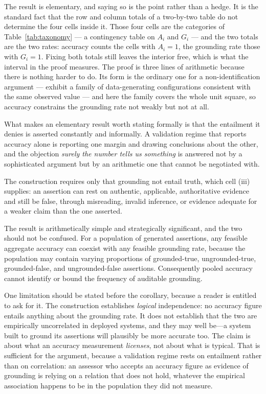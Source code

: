 The result is elementary, and saying so is the point rather than a hedge. It is the
standard fact that the row and column totals of a two-by-two table do not determine
the four cells inside it. Those four cells are the categories of
Table~\ref{tab:taxonomy} --- a contingency table on $A_i$ and $G_i$ --- and the two
totals are the two rates: accuracy counts the cells with $A_i = 1$, the grounding rate
those with $G_i = 1$. Fixing both totals still leaves the interior free, which is what
the interval in the proof measures. The proof is three lines of arithmetic because there is nothing harder
to do. Its form is the ordinary one for a non-identification argument --- exhibit a
family of data-generating configurations consistent with the same observed value ---
and here the family covers the whole unit square, so accuracy constrains the
grounding rate not weakly but not at all.

What makes an elementary result worth stating formally is that the entailment it
denies is asserted constantly and informally. A validation regime that reports
accuracy alone is reporting one margin and drawing conclusions about the other, and
the objection \emph{surely the number tells us something} is answered not by a
sophisticated argument but by an arithmetic one that cannot be negotiated with.

The construction requires only that grounding not entail truth, which cell (iii)
supplies: an assertion can rest on authentic, applicable, authoritative evidence
and still be false, through misreading, invalid inference, or evidence adequate for
a weaker claim than the one asserted.

The result is arithmetically simple and strategically significant, and the two
should not be confused. For a population of generated assertions, any feasible
aggregate accuracy can coexist with any feasible grounding rate, because the
population may contain varying proportions of grounded-true, ungrounded-true,
grounded-false, and ungrounded-false assertions. Consequently pooled accuracy
cannot identify or bound the frequency of auditable grounding.

One limitation should be stated before the corollary, because a reader is entitled to
ask for it. The construction establishes \emph{logical} independence: no accuracy
figure entails anything about the grounding rate. It does not establish that the two
are empirically uncorrelated in deployed systems, and they may well be---a system
built to ground its assertions will plausibly be more accurate too. The claim is about
what an accuracy measurement \emph{licenses}, not about what is typical. That is
sufficient for the argument, because a validation regime rests on entailment rather
than on correlation: an assessor who accepts an accuracy figure as evidence of
grounding is relying on a relation that does not hold, whatever the empirical
association happens to be in the population they did not measure.

